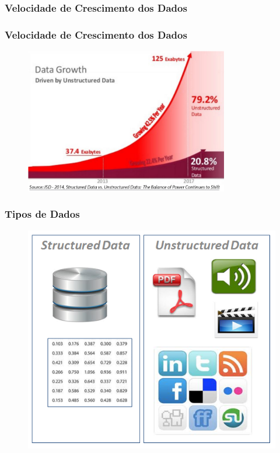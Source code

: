 \documentclass[10pt,xcolor=table]{beamer}
\begin{document}
\subsubsection{Velocidade de Crescimento dos Dados}
\begin{frame}\frametitle{Velocidade de Crescimento dos Dados} 
  \begin{figure}[hb]
    \includegraphics[width=3.5in]{Figure/dataGrowth.jpg}
  \end{figure}
\end{frame}

\begin{frame}\frametitle{Tipos de Dados} 
  \begin{figure}[hb]
    \includegraphics{Figure/datatype.png}
  \end{figure}
\end{frame}
\end{document}
